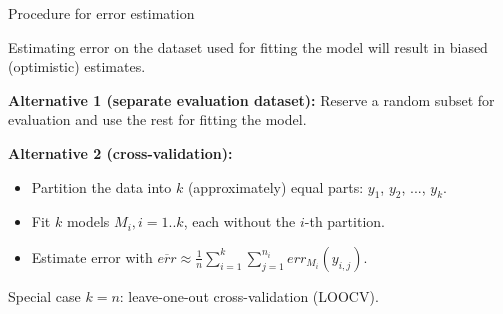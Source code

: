 \begin{frame}{Procedure for error estimation}

Estimating error on the dataset used for fitting the model will result in biased (optimistic) estimates.

\bigskip

\textbf{Alternative 1 (separate evaluation dataset):} Reserve a random subset for evaluation and use the rest for fitting the model.

\bigskip

\textbf{Alternative 2 (cross-validation):} 

\bigskip

\begin{itemize}
\item Partition the data into $k$ (approximately) equal parts: $ y_1$, $ y_2$, ..., $ y_k$.
\item Fit $k$ models $M_i, i = 1..k$, each without the $i$-th partition.
\item Estimate error with $\overline{err} \approx \frac{1}{n} \sum_{i=1}^k  \sum_{j=1}^{n_i} err_{M_i}(y_{i,j})$.
\end{itemize}

\bigskip

Special case $k = n$: leave-one-out cross-validation (LOOCV).
\end{frame}

